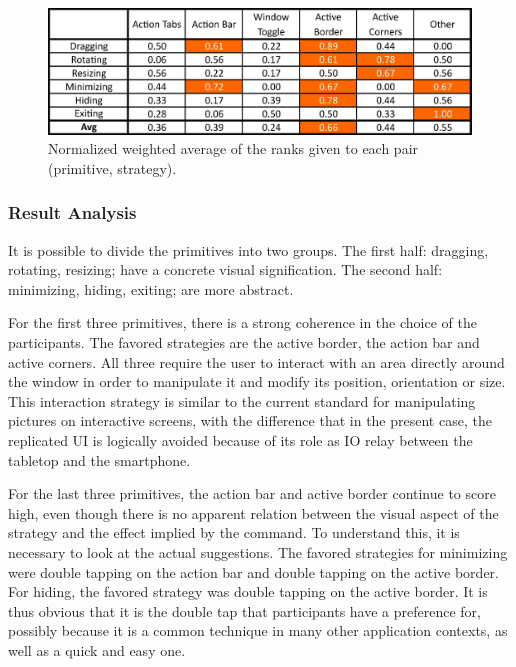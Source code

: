 \begin{figure}[htb]
  \centering
    \includegraphics[scale=1]{images/resultMatrix}
  \caption{Normalized weighted average of the ranks given to each pair (primitive, strategy).}
  \label{resultMatrix}
\end{figure}


\subsubsection{Result Analysis}

It is possible to divide the primitives into two groups.
The first half: dragging, rotating, resizing; have a concrete visual signification.
The second half: minimizing, hiding, exiting; are more abstract.

For the first three primitives, there is a strong coherence in the choice of the participants.
The favored strategies are the active border, the action bar and active corners.
All three require the user to interact with an area directly around the window in order to manipulate it and modify its position, orientation or size.
This interaction strategy is similar to the current standard for manipulating pictures on interactive screens, with the difference that in the present case, the replicated UI is logically avoided because of its role as IO relay between the tabletop and the smartphone.

For the last three primitives, the action bar and active border continue to score high, even though there is no apparent relation between the visual aspect of the strategy and the effect implied by the command.
To understand this, it is necessary to look at the actual suggestions.
The favored strategies for minimizing were double tapping on the action bar and double tapping on the active border.
For hiding, the favored strategy was double tapping on the active border.
It is thus obvious that it is the double tap that participants have a preference for, possibly because it is a common technique in many other application contexts, as well as a quick and easy one.

